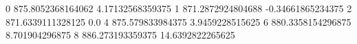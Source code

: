 0 875.8052368164062 4.17132568359375
1 871.2872924804688 -0.34661865234375
2 871.6339111328125 0.0
4 875.579833984375 3.9459228515625
6 880.3358154296875 8.701904296875
8 886.273193359375 14.6392822265625
